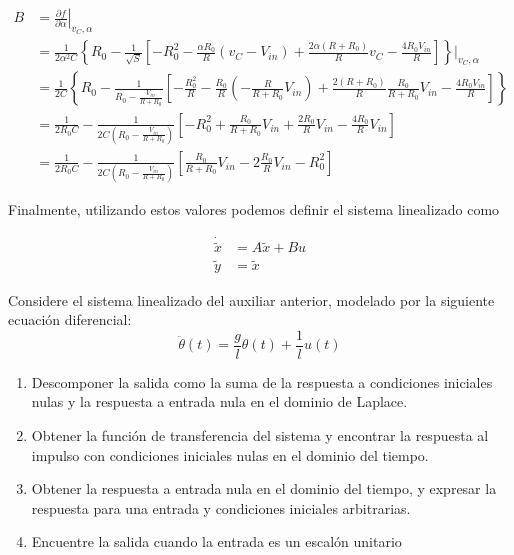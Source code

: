 \documentclass[
  11pt,
  letterpaper,
   addpoints,
   answers
  ]{exam}
\begin{document}
\begin{questions}
\begin{solution}
\begin{align}
B &= \left. \frac{\partial f}{\partial \alpha} \right|_{v_C, \alpha} \\[6pt]
&= \frac{1}{2\alpha^2 C} \left\{ 
     R_0 - \frac{1}{\sqrt{S}}
     \left[
       -R_0^2 - \frac{\alpha R_0}{R}(v_C - V_{in})
       + \frac{2\alpha(R+R_0)}{R}v_C 
       - \frac{4R_0 V_{in}}{R}
     \right]
   \right\}\bigg|_{v_C,\alpha} \\[6pt]
&= \frac{1}{2C} \left\{
     R_0 - \frac{1}{R_0 - \tfrac{V_{in}}{R+R_0}}
     \left[
       -\frac{R_0^2}{R} - \frac{R_0}{R}\!\left(-\frac{R}{R+R_0}V_{in}\right)
       + \frac{2(R+R_0)}{R}\frac{R_0}{R+R_0}V_{in}
       - \frac{4R_0 V_{in}}{R}
     \right]
   \right\} \\[6pt]
&= \frac{1}{2R_0 C} 
   - \frac{1}{2C\!\left(R_0 - \tfrac{V_{in}}{R+R_0}\right)}
     \left[
       -R_0^2 + \frac{R_0}{R+R_0}V_{in}
       + \frac{2R_0}{R}V_{in}
       - \frac{4R_0}{R}V_{in}
     \right] \\[6pt]
&= \frac{1}{2R_0 C} 
   - \frac{1}{2C\!\left(R_0 - \tfrac{V_{in}}{R+R_0}\right)}
     \left[
       \frac{R_0}{R+R_0}V_{in} - 2\frac{R_0}{R}V_{in} - R_0^2
     \right]
\end{align}

Finalmente, utilizando estos valores podemos definir el sistema linealizado como

\begin{align}
\dot{\tilde{x}} &= A\tilde{x} + Bu\\
\tilde{y} &= \tilde{x} 
\end{align}

\end{solution}


    \question Considere el sistema linealizado del auxiliar anterior, modelado por la siguiente ecuación diferencial:
    \begin{equation}
        \ddot{\theta}(t) = \frac{g}{l} \theta(t) + \frac{1}{l} u(t)
    \end{equation}

    \begin{enumerate}
        \item Descomponer la salida como la suma de la respuesta a condiciones iniciales nulas y la respuesta a entrada nula en el dominio de Laplace.
        \item Obtener la función de transferencia del sistema y encontrar la respuesta al impulso con condiciones iniciales nulas en el dominio del tiempo.
        \item Obtener la respuesta a entrada nula en el dominio del tiempo, y expresar la respuesta para una entrada y condiciones iniciales arbitrarias.
        \item Encuentre la salida cuando la entrada es un escalón unitario
    \end{enumerate}


\end{questions}
\end{document}
